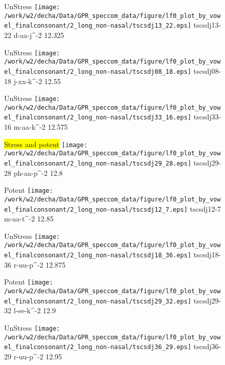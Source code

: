 \documentclass{article}
\begin{document}
\begin{figure}[t]
\begin{minipage}[b]{.24\textwidth}
UnStress
\centering
\texttt{[image: /work/w2/decha/Data/GPR\_speccom\_data/figure/lf0\_plot\_by\_vowel\_finalconsonant/2\_long\_non-nasal/tscsdj13\_22.eps]}
tscsdj13-22 d-aa-j\textasciicircum-2 12.325
\end{minipage}
\begin{minipage}[b]{.24\textwidth}
UnStress
\centering
\texttt{[image: /work/w2/decha/Data/GPR\_speccom\_data/figure/lf0\_plot\_by\_vowel\_finalconsonant/2\_long\_non-nasal/tscsdj08\_18.eps]}
tscsdj08-18 j-xx-k\textasciicircum-2 12.55
\end{minipage}
\begin{minipage}[b]{.24\textwidth}
UnStress
\centering
\texttt{[image: /work/w2/decha/Data/GPR\_speccom\_data/figure/lf0\_plot\_by\_vowel\_finalconsonant/2\_long\_non-nasal/tscsdj33\_16.eps]}
tscsdj33-16 m-aa-k\textasciicircum-2 12.575
\end{minipage}
\begin{minipage}[b]{.24\textwidth}
\colorbox{yellow}{Stress and potent}
\centering
\texttt{[image: /work/w2/decha/Data/GPR\_speccom\_data/figure/lf0\_plot\_by\_vowel\_finalconsonant/2\_long\_non-nasal/tscsdj29\_28.eps]}
tscsdj29-28 ph-aa-p\textasciicircum-2 12.8
\end{minipage}
\end{figure}

\begin{figure}[t]
\begin{minipage}[b]{.24\textwidth}
\colorbox{Apricot}{Potent}
\centering
\texttt{[image: /work/w2/decha/Data/GPR\_speccom\_data/figure/lf0\_plot\_by\_vowel\_finalconsonant/2\_long\_non-nasal/tscsdj12\_7.eps]}
tscsdj12-7 m-aa-t\textasciicircum-2 12.85
\end{minipage}
\begin{minipage}[b]{.24\textwidth}
UnStress
\centering
\texttt{[image: /work/w2/decha/Data/GPR\_speccom\_data/figure/lf0\_plot\_by\_vowel\_finalconsonant/2\_long\_non-nasal/tscsdj18\_36.eps]}
tscsdj18-36 r-uu-p\textasciicircum-2 12.875
\end{minipage}
\begin{minipage}[b]{.24\textwidth}
\colorbox{Apricot}{Potent}
\centering
\texttt{[image: /work/w2/decha/Data/GPR\_speccom\_data/figure/lf0\_plot\_by\_vowel\_finalconsonant/2\_long\_non-nasal/tscsdj29\_32.eps]}
tscsdj29-32 l-ee-k\textasciicircum-2 12.9
\end{minipage}
\begin{minipage}[b]{.24\textwidth}
UnStress
\centering
\texttt{[image: /work/w2/decha/Data/GPR\_speccom\_data/figure/lf0\_plot\_by\_vowel\_finalconsonant/2\_long\_non-nasal/tscsdj36\_29.eps]}
tscsdj36-29 r-uu-p\textasciicircum-2 12.95
\end{minipage}
\end{figure}
\end{document}
